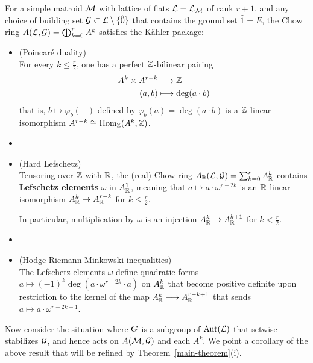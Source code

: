 \begin{thm}
\label{AHK-theorem}
For a simple matroid $\mathcal{M}$ with lattice of flats $\mathcal{L}=\mathcal{L}_{\mathcal{M}}$ of rank $r+1$, and any choice of building set $\mathcal{G} \subset \mathcal{L} \setminus \{\hat{0}\}$ that contains the ground set $\hat{1}=E$, the Chow ring $A(\mathcal{L},\mathcal{G})=\bigoplus_{k=0}^r A^k$ satisfies the 
K\"ahler package:
\begin{itemize}
\item (Poincar\'e duality)\\ 
For every $k \leq \frac{r}{2}$, 
one has a perfect $\mathbb{Z}$-bilinear pairing
\begin{align*}
    A^k \times A^{r-k} &\longrightarrow \mathbb{Z} \\ 
    (a,b) &\longmapsto \deg(a \cdot b)
\end{align*}
that is, $b \longmapsto \varphi_b(-)$ defined by
$\varphi_b(a)=\deg(a \cdot b)$ is a
$\mathbb{Z}$-linear isomorphism $A^{r-k} \cong \mathrm{Hom}_{\mathbb{Z}}(A^k,\mathbb{Z})$.
\item[]
\item (Hard Lefschetz)\\
Tensoring over $\mathbb{Z}$ with $\mathbb{R}$, the (real) Chow ring $A_{\mathbb{R}}(\mathcal{L},\mathcal{G})=\sum_{k=0}^r A^k_{\mathbb{R}}$ contains {\textbf{Lefschetz elements}} $\omega$ in $A^1_{\mathbb{R}}$, meaning
that $a \mapsto a \cdot \omega^{r-2k}$ is an $\mathbb{R}$-linear isomorphism $A^k_{\mathbb{R}} \rightarrow A^{r-k}_{\mathbb{R}}$ for $k \leq \frac{r}{2}$.

In particular, multiplication by $\omega$ is an injection $A^k_{\mathbb{R}} \rightarrow A_{\mathbb{R}}^{k+1}$ for $k < \frac{r}{2}$.
\item[]
\item (Hodge-Riemann-Minkowski inequalities)\\
The Lefschetz elements $\omega$ define quadratic forms 
$a \longmapsto (-1)^k \deg(a \cdot \omega^{r-2k} \cdot a)$
on $A^k_{\mathbb{R}}$ that become positive definite 
upon restriction to the kernel of the map
$A^k_{\mathbb{R}} \longrightarrow A^{r-k+1}_{\mathbb{R}}$ that sends 
$a \longmapsto  a \cdot \omega^{r-2k+1}$.
\end{itemize}
\end{thm}

Now consider the situation where $G$ is a subgroup of $\operatorname{\mathrm{Aut}}(\mathcal{L})$ that setwise stabilizes $\mathcal{G}$, and hence acts on $A(\mathcal{M}, \mathcal{G})$ and each $A^k$.  We point a corollary of the above result that will be refined by Theorem~\ref{main-theorem}(i).

